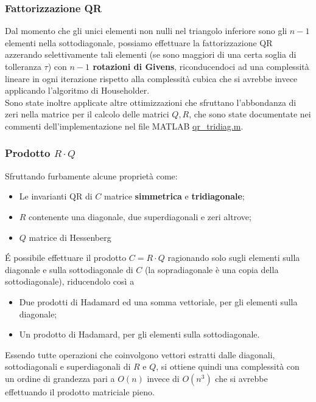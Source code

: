 \subsubsection{Fattorizzazione QR}
Dal momento che gli unici elementi non nulli nel triangolo inferiore sono gli 
$n-1$ elementi nella sottodiagonale, possiamo effettuare la fattorizzazione QR 
azzerando selettivamente tali elementi (se sono maggiori di una certa soglia di 
tolleranza $\tau$) con \textbf{$n-1$ rotazioni di Givens}, riconducendoci ad una 
complessità lineare in ogni iterazione rispetto alla complessità cubica che si 
avrebbe invece applicando l'algoritmo di Householder. \\
Sono state inoltre applicate altre ottimizzazioni che sfruttano l'abbondanza di 
zeri nella matrice per il calcolo delle matrici $Q,R$, che sono state 
documentate nei commenti dell'implementazione nel file MATLAB 
\href{https://github.com/Yagotzirck/svd_benchmark/blob/main/src/qr_tridiag.m}{qr\_tridiag.m}.

\subsubsection{Prodotto $R \cdot Q$}
Sfruttando furbamente alcune proprietà come:
\begin{itemize}
	\item Le invarianti QR di $C$ matrice \textbf{simmetrica} e 
\textbf{tridiagonale};
	\item $R$ contenente una diagonale, due superdiagonali e zeri altrove;
	\item $Q$ matrice di Hessenberg
\end{itemize}

É possibile effettuare il prodotto $C = R \cdot Q$ ragionando solo sugli 
elementi sulla diagonale e sulla sottodiagonale di $C$ (la sopradiagonale è una 
copia della sottodiagonale), riducendolo così a
\begin{itemize}
	\item Due prodotti di Hadamard ed una somma vettoriale, per gli elementi sulla diagonale;
	\item Un prodotto di Hadamard, per gli elementi sulla sottodiagonale.
\end{itemize}
Essendo tutte operazioni che coinvolgono vettori estratti dalle diagonali, 
sottodiagonali e superdiagonali di $R$ e $Q$, si ottiene quindi una complessità 
con un ordine di grandezza pari a $O(n)$ invece di $O(n^3)$ che si avrebbe 
effettuando il prodotto matriciale pieno. 

